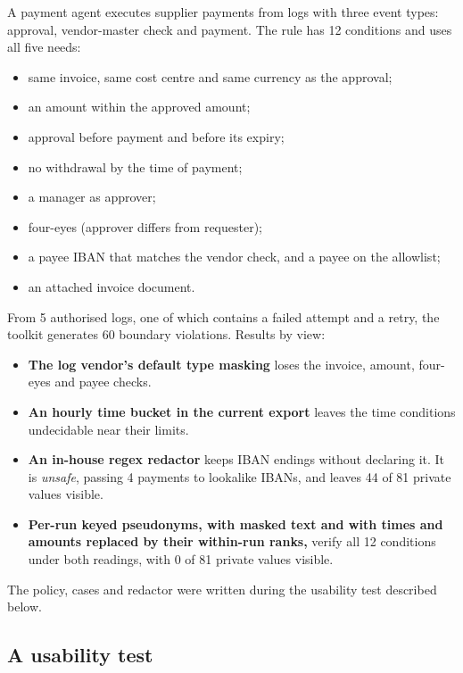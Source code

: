 \documentclass[11pt]{article}
\begin{document}
A payment agent executes supplier payments from logs with three event types: approval, vendor-master check and payment. The rule has 12 conditions and uses all five needs:
\begin{itemize}
  \item same invoice, same cost centre and same currency as the approval;
  \item an amount within the approved amount;
  \item approval before payment and before its expiry;
  \item no withdrawal by the time of payment;
  \item a manager as approver;
  \item four-eyes (approver differs from requester);
  \item a payee IBAN that matches the vendor check, and a payee on the allowlist;
  \item an attached invoice document.
\end{itemize}
From 5 authorised logs, one of which contains a failed attempt and a retry, the toolkit generates 60 boundary violations. Results by view:
\begin{itemize}
  \item \textbf{The log vendor's default type masking} loses the invoice, amount, four-eyes and payee checks.
  \item \textbf{An hourly time bucket in the current export} leaves the time conditions undecidable near their limits.
  \item \textbf{An in-house regex redactor} keeps IBAN endings without declaring it. It is \emph{unsafe}, passing 4 payments to lookalike IBANs, and leaves 44 of 81 private values visible.
  \item \textbf{Per-run keyed pseudonyms, with masked text and with times and amounts replaced by their within-run ranks,} verify all 12 conditions under both readings, with 0 of 81 private values visible.
\end{itemize}
The policy, cases and redactor were written during the usability test described below.

\subsection*{A usability test}
\end{document}
